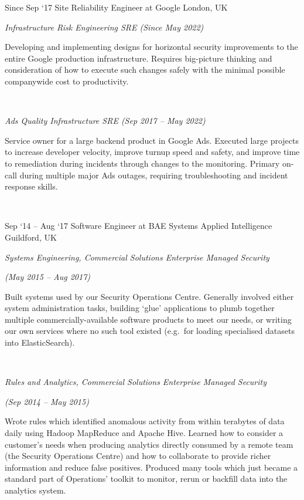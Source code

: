 \documentclass[a4paper]{friggeri-cv} %
\begin{document}
\begin{entrylist}
\entry
{{\footnotesize Since Sep `17}}
{Site Reliability Engineer at Google}
{London, UK}
{\emph{Infrastructure Risk Engineering SRE (Since May 2022)} 

Developing and implementing designs for horizontal security improvements
to the entire Google production infrastructure.  Requires big-picture thinking and
consideration of how to execute such changes safely with the minimal possible
companywide cost to productivity.

~

\emph{Ads Quality Infrastructure SRE (Sep 2017 -- May 2022)}

Service owner for a large backend product in Google Ads.  Executed large
projects to increase developer velocity, improve turnup speed and
safety, and improve time to remediation during incidents through changes
to the monitoring.  Primary on-call during multiple major Ads outages, requiring troubleshooting
and incident response skills.

~

}
\entry
{{\footnotesize Sep `14 -- Aug `17}}
{Software Engineer at BAE Systems Applied Intelligence}
{Guildford, UK}
{\emph{Systems Engineering, Commercial Solutions Enterprise Managed Security}

\emph{(May 2015 -- Aug 2017)}

Built systems used by our Security Operations Centre.  Generally involved
either system administration tasks, building `glue' applications to plumb
together multiple commercially-available software products to meet our
needs, or writing our own services where no such tool existed (e.g.\ for
loading specialised datasets into ElasticSearch).

~

\emph{Rules and Analytics, Commercial Solutions Enterprise Managed Security}

\emph{(Sep 2014 -- May 2015)}

Wrote rules which identified anomalous activity from within terabytes of data
daily using Hadoop MapReduce and Apache Hive.  Learned how to consider
a customer's needs when producing analytics directly consumed by a remote
team (the Security Operations Centre) and how to collaborate to
provide richer information and reduce false positives.  Produced many
tools which just became a standard part of Operations' toolkit to monitor, rerun
or backfill data into the analytics system.
}
\end{entrylist}
\end{document}
